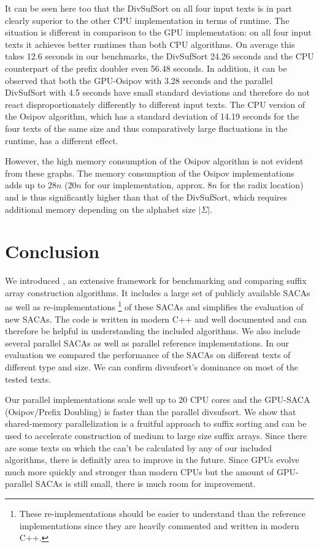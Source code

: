 It can be seen here too that the DivSufSort on all four input texts is in part clearly superior to the other CPU implementation in terms of runtime. The situation is different in comparison to the GPU implementation: on all four input texts it achieves better runtimes than both CPU algorithms. On average this takes 12.6 seconds in our benchmarks, the DivSufSort 24.26 seconds and the CPU counterpart of the prefix doubler even 56.48 seconds. 
In addition, it can be observed that both the GPU-Osipov with 3.28 seconds and the parallel DivSufSort with 4.5 seconds have small standard deviations and therefore do not react disproportionately differently to different input texts. The CPU version of the Osipov algorithm, which has a standard deviation of 14.19 seconds for the four texts of the same size and thus comparatively large fluctuations in the runtime, has a different effect.

However, the high memory consumption of the Osipov algorithm is not evident from these graphs. The memory consumption of the Osipov implementations adds up to $28n$ ($20n$ for our implementation, approx. $8n$ for the radix location) and is thus significantly higher than that of the DivSufSort, which requires additional memory depending on the alphabet size $|\Sigma|$.

\section{Conclusion}

We introduced \sacabench, an extensive framework for benchmarking and comparing suffix array construction algorithms.
It includes a large set of publicly available SACAs as well as re-implementations%
\footnote{These re-implementations should be easier to understand than the reference implementations since they are heavily commented and written in modern C++.}
of these SACAs and simplifies the evaluation of new SACAs.
The code is written in modern C++ and well documented and can therefore be helpful in understanding the included algorithms.
We also include several parallel SACAs as well as parallel reference implementations.
In our evaluation we compared the performance of the SACAs on different texts of different type and size.
We can confirm divsufsort's dominance on most of the tested texts.

Our parallel implementations scale well up to 20 CPU cores and the GPU-SACA (Osipov/Prefix Doubling) is faster than the parallel divsufsort.
We show that shared-memory parallelization is a fruitful approach to suffix sorting
and can be used to accelerate construction of medium to large size suffix arrays.
Since there are some texts on which the \sa can't be calculated by any of our included algorithms,
there is definitly area to improve in the future.
Since GPUs evolve much more quickly and stronger than modern CPUs
but the amount of GPU-parallel SACAs is still small, there is much room for improvement.

